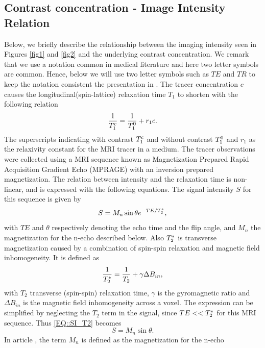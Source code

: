 \documentclass[11pt,a4paper]{article}
\begin{document}
\subsection{Contrast concentration - Image Intensity Relation}
Below, we briefly describe the relationship between the imaging intensity 
seen in Figures \ref{fig1} and \ref{fig2} and the underlying contrast 
concentration. We remark that we use a notation common in medical literature and here two letter symbols are common. Hence, below we will use two letter symbols such as $TE$ and $TR$ to keep the notation consistent the presentation in \cite{GOWLAND, MPRAGE}.   
The tracer concentration $c$ causes the longitudinal(spin-lattice) relaxation time $T_{1}$ to shorten with the following relation
\begin{equation}
\frac{1}{T_{1}\sp{c}} = \frac{1}{T_{1}\sp{0}} + r_{1}c .
\label{EQ::contrast}
\end{equation}
The superscripts indicating with contrast $T_{1}\sp{c}$ and without contrast $T_{1}\sp{0}$ and $r_1$ as the relaxivity constant for the MRI tracer in a medium. 
The tracer observations were collected using a MRI sequence known as  Magnetization Prepared Rapid Acquisition Gradient Echo (MPRAGE) with an inversion prepared magnetization. The relation between intensity and the relaxation time is non-linear, and is expressed with the following equations. The signal intensity $S$ for this sequence is given by
\begin{equation}
S = M_{n} \sin \theta e\sp{ - TE/T_2\sp{*} },
\label{EQ::SI_T2}
\end{equation}
with $TE$ and $\theta$ respectively denoting the echo time and the flip angle, and $M_{n}$ the magnetization for the n-echo described below. 
Also $T_2\sp{*}$ is transverse magnetization caused by a combination of spin-spin relaxation and magnetic field inhomogeneity. It is defined as 
\begin{equation}
\frac{1}{T_2\sp{*}} = \frac{1}{T_2} + \gamma \Delta B_{in} ,
\end{equation}
with $T_2$ transverse (spin-spin) relaxation time, $\gamma$ is the gyromagnetic ratio and $\Delta B_{in}$ is the magnetic field inhomogeneity across a voxel. The expression can be simplified by neglecting the $T_2$ term in the signal, since $TE <<T_2\sp{*}$ for this MRI sequence. Thus \eqref{EQ::SI_T2} becomes 
\begin{equation}
S = M_{n} \sin \theta.
\label{EQ::SI}
\end{equation}
In article \cite{GOWLAND}, the term $M_n$ is defined as the magnetization for the n-echo 
\end{document}
